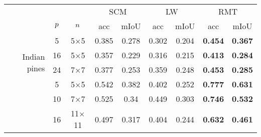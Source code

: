 \documentclass{article}
\theoremstyle{plain}
\theoremstyle{definition}
\theoremstyle{remark}
\begin{document}
\begin{table*}[t]
\centering
\begin{tabular}{rcccccccc}
                              &               &                       & \multicolumn{2}{c}{SCM} & \multicolumn{2}{c}{LW} & \multicolumn{2}{c}{RMT}         \\
                              & $p$ & $n$ & acc             & mIoU  & acc          & mIoU        & acc            & mIoU           \\ \cline{2-9} 
\multirow{4}{*}{Indian pines} & 5             & 5$\times$5            & 0.385           & 0.278 & 0.302        & 0.204       & \textbf{0.454} & \textbf{0.367} \\
                              & 16            & 5$\times$5            & 0.357           & 0.229 & 0.316        & 0.215       & \textbf{0.413} & \textbf{0.284} \\ & 24            & 7$\times$7            & 0.377           & 0.253 & 0.359        & 0.248       & \textbf{0.453} & \textbf{0.285} \\
                              \cline{2-9} 
\multirow{4}{*}{Salinas}      & 5             & 5$\times$5            & 0.542           & 0.382 & 0.402        & 0.252       & \textbf{0.777} & \textbf{0.631} \\
                              & 10            & 7$\times$7            & 0.525           & 0.34  & 0.449        & 0.303       & \textbf{0.746} & \textbf{0.532} \\
                              & 16            & 11$\times$11          & 0.497           & 0.317 & 0.404        & 0.244       & \textbf{0.632} & \textbf{0.461} \\ \cline{2-9} 

\end{tabular}
\end{table*}
\end{document}
